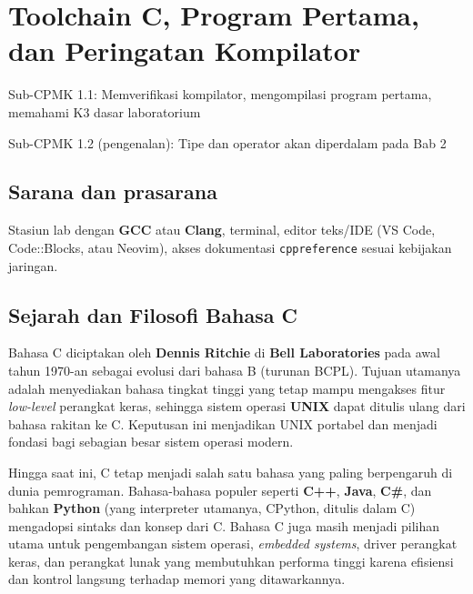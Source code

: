 \documentclass[../main.tex]{subfiles}
\begin{document}
\chapter{Toolchain C, Program Pertama, dan Peringatan Kompilator}

\begin{subcpmk}
  \item Sub-CPMK 1.1: Memverifikasi kompilator, mengompilasi program pertama, memahami K3 dasar laboratorium
  \item Sub-CPMK 1.2 (pengenalan): Tipe dan operator akan diperdalam pada Bab 2
\end{subcpmk}


\section{Sarana dan prasarana}

Stasiun lab dengan \textbf{GCC} atau \textbf{Clang}, terminal, editor teks/IDE (VS Code, Code::Blocks, atau Neovim), akses dokumentasi \texttt{cppreference} sesuai kebijakan jaringan.

\section{Sejarah dan Filosofi Bahasa C}

Bahasa C diciptakan oleh \textbf{Dennis Ritchie} di \textbf{Bell Laboratories} pada awal tahun 1970-an sebagai evolusi dari bahasa B (turunan BCPL). Tujuan utamanya adalah menyediakan bahasa tingkat tinggi yang tetap mampu mengakses fitur \textit{low-level} perangkat keras, sehingga sistem operasi \textbf{UNIX} dapat ditulis ulang dari bahasa rakitan ke C. Keputusan ini menjadikan UNIX portabel dan menjadi fondasi bagi sebagian besar sistem operasi modern.

Hingga saat ini, C tetap menjadi salah satu bahasa yang paling berpengaruh di dunia pemrograman. Bahasa-bahasa populer seperti \textbf{C++}, \textbf{Java}, \textbf{C\#}, dan bahkan \textbf{Python} (yang interpreter utamanya, CPython, ditulis dalam C) mengadopsi sintaks dan konsep dari C. Bahasa C juga masih menjadi pilihan utama untuk pengembangan sistem operasi, \textit{embedded systems}, driver perangkat keras, dan perangkat lunak yang membutuhkan performa tinggi karena efisiensi dan kontrol langsung terhadap memori yang ditawarkannya.
\end{document}
